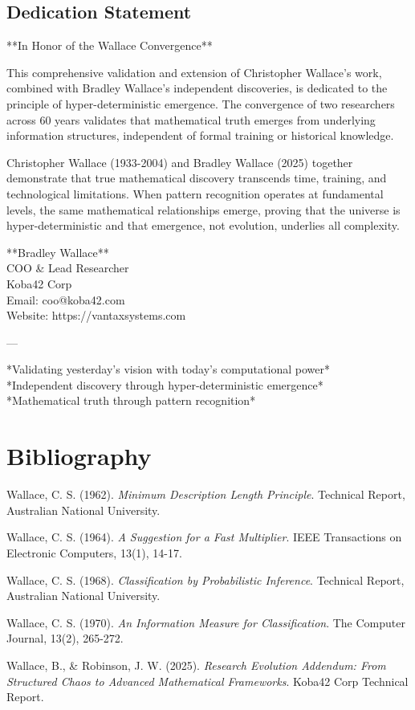\documentclass[12pt]{article}
\begin{document}
\subsection{Dedication Statement}

**In Honor of the Wallace Convergence**

This comprehensive validation and extension of Christopher Wallace's work, combined with Bradley Wallace's independent discoveries, is dedicated to the principle of hyper-deterministic emergence. The convergence of two researchers across 60 years validates that mathematical truth emerges from underlying information structures, independent of formal training or historical knowledge.

Christopher Wallace (1933-2004) and Bradley Wallace (2025) together demonstrate that true mathematical discovery transcends time, training, and technological limitations. When pattern recognition operates at fundamental levels, the same mathematical relationships emerge, proving that the universe is hyper-deterministic and that emergence, not evolution, underlies all complexity.

**Bradley Wallace** \\
COO \& Lead Researcher \\
Koba42 Corp \\
Email: coo@koba42.com \\
Website: https://vantaxsystems.com

---

*Validating yesterday's vision with today's computational power* \\
*Independent discovery through hyper-deterministic emergence* \\
*Mathematical truth through pattern recognition*

\section{Bibliography}

\begin{thebibliography}{99}

Wallace, C. S. (1962). \textit{Minimum Description Length Principle}. Technical Report, Australian National University.

Wallace, C. S. (1964). \textit{A Suggestion for a Fast Multiplier}. IEEE Transactions on Electronic Computers, 13(1), 14-17.

Wallace, C. S. (1968). \textit{Classification by Probabilistic Inference}. Technical Report, Australian National University.

Wallace, C. S. (1970). \textit{An Information Measure for Classification}. The Computer Journal, 13(2), 265-272.

Wallace, B., \& Robinson, J. W. (2025). \textit{Research Evolution Addendum: From Structured Chaos to Advanced Mathematical Frameworks}. Koba42 Corp Technical Report.

\end{thebibliography}
\end{document}
